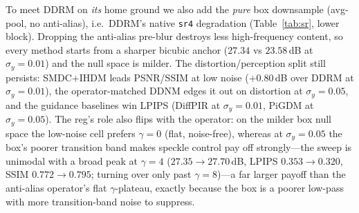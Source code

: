 \documentclass[11pt]{article}
\begin{document}
To meet DDRM on \emph{its} home ground we also add the \emph{pure} box downsample (avg-pool, no
anti-alias), i.e.\ DDRM's native \texttt{sr4} degradation (Table~\ref{tab:sr}, lower block). Dropping
the anti-alias pre-blur destroys less high-frequency content, so every method starts from a sharper
bicubic anchor ($27.34$ vs $23.58$\,dB at $\sigma_y{=}0.01$) and the null space is milder. The
distortion/perception split still persists: SMDC$+$IHDM leads PSNR/SSIM at low noise ($+0.80$\,dB
over DDRM at $\sigma_y{=}0.01$), the operator-matched DDNM edges it out on distortion at
$\sigma_y{=}0.05$, and the guidance baselines win LPIPS (DiffPIR at $\sigma_y{=}0.01$, PiGDM at
$\sigma_y{=}0.05$). The reg's role also flips with the operator:
on the milder box null space the low-noise cell prefers $\gamma{=}0$ (flat, noise-free), whereas at
$\sigma_y{=}0.05$ the box's poorer transition band makes speckle control pay off strongly---the sweep
is unimodal with a broad peak at $\gamma{=}4$ ($27.35\!\to\!\mathbf{27.70}$\,dB, LPIPS
$0.353\!\to\!0.320$, SSIM $0.772\!\to\!0.795$; turning over only past $\gamma{=}8$)---a far larger
payoff than the anti-alias operator's flat $\gamma$-plateau, exactly because the box is a poorer
low-pass with more transition-band noise to suppress.
\end{document}
